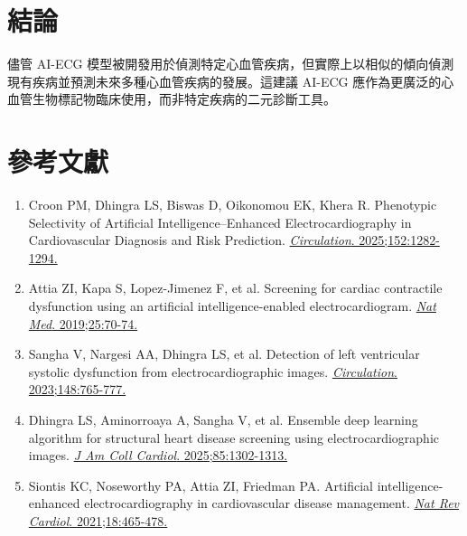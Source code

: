 \documentclass[12pt,a4paper]{article}
\begin{document}
\section{結論}

\begin{importantbox}
儘管 AI-ECG 模型被開發用於偵測特定心血管疾病，但實際上以相似的傾向偵測現有疾病並預測未來多種心血管疾病的發展。這建議 AI-ECG 應作為更廣泛的心血管生物標記物臨床使用，而非特定疾病的二元診斷工具。
\end{importantbox}

\section{參考文獻}

\begin{enumerate}
    \item Croon PM, Dhingra LS, Biswas D, Oikonomou EK, Khera R. Phenotypic Selectivity of Artificial Intelligence–Enhanced Electrocardiography in Cardiovascular Diagnosis and Risk Prediction. \href{https://doi.org/10.1161/CIRCULATIONAHA.125.076279}{\textit{Circulation}. 2025;152:1282-1294.}

    \item Attia ZI, Kapa S, Lopez-Jimenez F, et al. Screening for cardiac contractile dysfunction using an artificial intelligence-enabled electrocardiogram. \href{https://doi.org/10.1038/s41591-018-0240-2}{\textit{Nat Med}. 2019;25:70-74.}

    \item Sangha V, Nargesi AA, Dhingra LS, et al. Detection of left ventricular systolic dysfunction from electrocardiographic images. \href{https://doi.org/10.1161/CIRCULATIONAHA.122.062646}{\textit{Circulation}. 2023;148:765-777.}

    \item Dhingra LS, Aminorroaya A, Sangha V, et al. Ensemble deep learning algorithm for structural heart disease screening using electrocardiographic images. \href{https://doi.org/10.1016/j.jacc.2025.01.030}{\textit{J Am Coll Cardiol}. 2025;85:1302-1313.}

    \item Siontis KC, Noseworthy PA, Attia ZI, Friedman PA. Artificial intelligence-enhanced electrocardiography in cardiovascular disease management. \href{https://doi.org/10.1038/s41569-020-00503-2}{\textit{Nat Rev Cardiol}. 2021;18:465-478.}
\end{enumerate}
\end{document}
